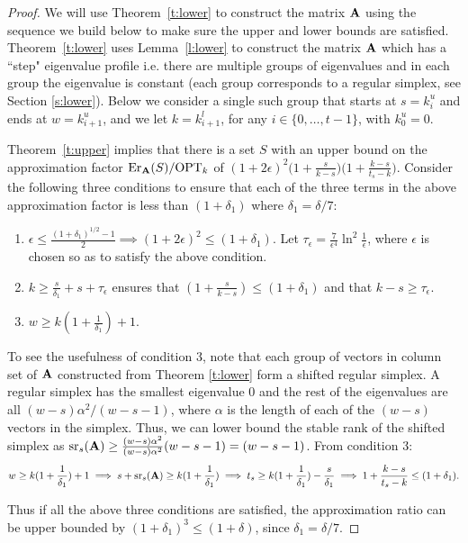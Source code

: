 \documentclass{article}
\begin{document}
\begin{proof}
We will use Theorem~\ref{t:lower} to construct the matrix $\mathbf A$ using
the sequence we build below to make sure the upper and lower bounds
are satisfied. Theorem~\ref{t:lower} uses Lemma~\ref{l:lower} to
construct the matrix $\mathbf A$ which has a ``step" eigenvalue profile
i.e. there are multiple groups of eigenvalues and in each group the
eigenvalue is constant (each group corresponds to a regular simplex, see
Section \ref{s:lower}). Below we consider a single such group that
starts at $s = k^u_i$ and ends at $w=k^u_{i+1}$, and we let $k = k^l_{i+1}$,
for any $i \in \{0,\ldots,t-1\}$, with $k^u_0=0$.   

Theorem~\ref{t:upper} implies that there is a set $S$ with an upper bound on the
approximation factor $\mathrm{Er}_\mathbf A(S)/\text{OPT}_k$ of
$(1+2\epsilon)^2\big(1+ \frac{s}{k-s}\big)\big( 1+ \frac{k-s}{t_s-
    k } \big)$. Consider the following three conditions to ensure that each
of the three terms in the above approximation factor is less than $(1+\delta_1)$ where $\delta_1 =
\delta/7$: 

\begin{enumerate}
\item $\epsilon \leq \frac{ (1+\delta_1 )^{1/2} - 1}{2} \implies
  (1+2\epsilon)^2 \leq (1+\delta_1) $. Let $\tau_\epsilon =
  \frac{7}{\epsilon^4} \ln^2 \frac{1}{\epsilon}$, where $\epsilon$ is
  chosen so as to satisfy the above condition. 
\item  $k \geq \frac{s}{\delta_1} + s + \tau_\epsilon$ ensures that $(1+\frac{s}{k-s}) \leq (1+\delta_1)$ and that $k-s \geq \tau_\epsilon$.
\item $w \geq k(1+\frac{1}{\delta_1}) +1$.
  \end{enumerate}
  To see the usefulness of condition 3, note that each group of
  vectors in column set of  $\mathbf A$ constructed from Theorem \ref{t:lower} form a
  shifted regular simplex. A regular simplex has the smallest
  eigenvalue $0$ and the rest of the eigenvalues are all $(w-s)
  \alpha^2/(w-s-1)$, where $\alpha$ is the length of each of the
  $(w-s)$ vectors in the simplex. Thus, we can lower bound the stable
  rank of the shifted simplex as ${\mathrm{sr}}_s(\mathbf A) \geq
  \frac{(w-s)\alpha^2}{(w-s) \alpha^2} (w-s-1) = (w-s-1)$. From
  condition 3: 
  \[  w \geq k(1+\frac{1}{\delta_1}) +1  \implies s + {\mathrm{sr}}_s(\mathbf A) \geq k(1+\frac{1}{\delta_1}) \implies t_s \geq k(1+\frac{1}{\delta_1}) -\frac{s}{\delta_1} \implies 1+ \frac{k-s}{t_s-k}  \leq (1+\delta_1).\]	

Thus if all the above three conditions are satisfied, the approximation ratio can be upper bounded by $(1+\delta_1)^3 \leq (1+\delta)$, since $\delta_1 = \delta/7$.


\end{proof}
\end{document}
